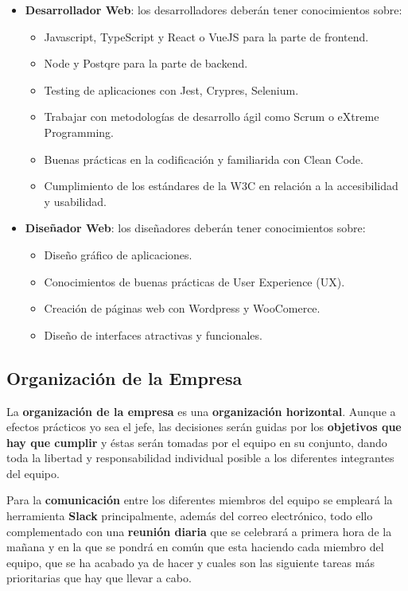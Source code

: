 \begin{itemize}
    \item \textbf{Desarrollador Web}: los desarrolladores deberán tener conocimientos sobre:
    \begin{itemize}
        \item Javascript, TypeScript y React o VueJS para la parte de frontend.
        \item Node y Postqre para la parte de backend.
        \item Testing de aplicaciones con Jest, Crypres, Selenium.
        \item Trabajar con metodologías de desarrollo ágil como Scrum o eXtreme Programming.
        \item Buenas prácticas en la codificación y familiarida con Clean Code.
        \item Cumplimiento de los estándares de la W3C en relación a la accesibilidad y usabilidad.
    \end{itemize}

    \item \textbf{Diseñador Web}: los diseñadores deberán tener conocimientos sobre:
    \begin{itemize}
        \item Diseño gráfico de aplicaciones.
        \item Conocimientos de buenas prácticas de User Experience (UX).
        \item Creación de páginas web con Wordpress y WooComerce.
        \item Diseño de interfaces atractivas y funcionales.
    \end{itemize}
\end{itemize}


\subsection{Organización de la Empresa}
La \textbf{organización de la empresa} es una \textbf{organización horizontal}. Aunque a efectos prácticos yo sea el jefe, las decisiones serán guidas por los \textbf{objetivos que hay que cumplir} y éstas serán tomadas por el equipo en su conjunto, dando toda la libertad y responsabilidad individual posible a los diferentes integrantes del equipo.

Para la \textbf{comunicación} entre los diferentes miembros del equipo se empleará la herramienta \textbf{Slack} principalmente, además del correo electrónico, todo ello complementado con una \textbf{reunión diaria} que se celebrará a primera hora de la mañana y en la que se pondrá en común que esta haciendo cada miembro del equipo, que se ha acabado ya de hacer y cuales son las siguiente tareas más prioritarias que hay que llevar a cabo.

